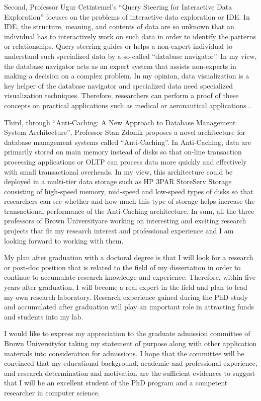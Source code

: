 \documentclass[a4paper,10pt]{report}
\newcommand{\university}{Brown University}
\begin{document}
\vspace{0.2cm}
Second, Professor Ugur Cetintemel's ``Query Steering for Interactive Data Exploration'' focuses on the problems of interactive data exploration or IDE. In IDE, the structure, meaning, and contents of data are so unknown that an individual has to interactively work on such data in order to identify the patterns or relationships. Query steering guides or helps a non-expert individual to understand such specialized data by a so-called ``database navigator''. In my view, the database navigator acts as an expert system that assists non-experts in making a decision on a complex problem. In my opinion, data visualization is a key helper of the database navigator and specialized data need specialized visualization techniques. Therefore, researchers can perform a proof of these concepts on practical applications such as medical or aeronautical applications .

\vspace{0.2cm}
Third, through ``Anti-Caching: A New Approach to Database Management System Architecture'', Professor Stan Zdonik proposes a novel architecture for database management systems called ``Anti-Caching''. In Anti-Caching, data are primarily stored on main memory instead of disks so that on-line transaction processing applications or OLTP can process data more quickly and effectively with small transactional overheads. In my view, this architecture could be deployed in a multi-tier data storage such as HP 3PAR StoreServ Storage consisting of high-speed memory, mid-speed and low-speed types of disks so that researchers can see whether and how much this type of storage helps increase the transactional performance of the Anti-Caching architecture. In sum, all the three professors of \university \space are working on interesting and exciting research projects that fit my research interest and professional experience and I am looking forward to working with them.

\vspace{0.2cm}
My plan after graduation with a doctoral degree is that I will look for a research or post-doc position that is related to the field of my dissertation in order to continue to accumulate research knowledge and experience. Therefore, within five years after graduation, I will become a real expert in the field and plan to lead my own research laboratory. Research experience gained during the PhD study and accumulated after graduation will play an important role in attracting funds and students into my lab.

\vspace{0.2cm}
I would like to express my appreciation to the graduate admission committee of \university \space for taking my  statement of purpose along with other application materials into consideration for admissions. I hope that the committee will be convinced that my educational background, academic and professional experience, and research determination and motivation are the sufficient evidences to suggest that I will be an excellent student of the PhD program and a competent researcher in computer science.
\end{document}
